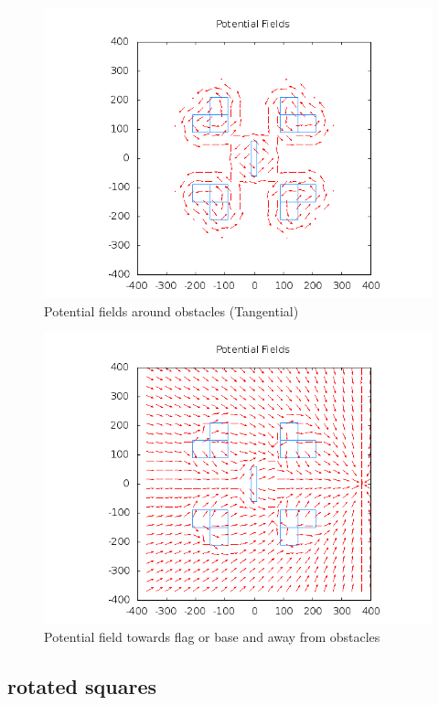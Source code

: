 \documentclass[11pt]{article}
\begin{document}
\begin{figure}[h]
	\caption{Potential fields around obstacles (Tangential)}
	\includegraphics[scale=.2]{plots/four_ls/pfObstaclesTangential.png}
\end{figure}
\begin{figure}[h]
	\caption{Potential field towards flag or base and away from obstacles}
	\includegraphics[scale=.2]{plots/four_ls/pfFlagsAndObstacles.png}
\end{figure}

\subsection{rotated squares}
\end{document}
